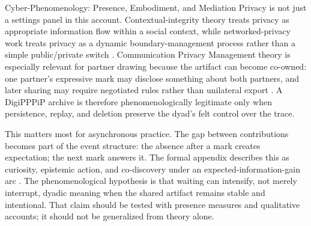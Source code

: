 \documentclass[
  ignorenonframetext,
]{beamer}
\begin{document}
\begin{frame}[allowframebreaks]{Cyber-Phenomenology: Presence,
Embodiment, and Mediation}
Privacy is not just a settings panel in this account.
Contextual-integrity theory treats privacy as appropriate information
flow within a social context, while networked-privacy work treats
privacy as a dynamic boundary-management process rather than a simple
public/private switch . Communication Privacy Management theory is
especially relevant for partner drawing because the artifact can become
co-owned: one partner's expressive mark may disclose something about
both partners, and later sharing may require negotiated rules rather
than unilateral export . A DigiPPPiP archive is
therefore phenomenologically legitimate only when persistence, replay,
and deletion preserve the dyad's felt control over the trace.

This matters most for asynchronous practice. The gap between
contributions becomes part of the event structure: the absence after a
mark creates expectation; the next mark answers it. The formal appendix
describes this as curiosity, epistemic action, and co-discovery under an
expected-information-gain arc . The
phenomenological hypothesis is that waiting can intensify, not merely
interrupt, dyadic meaning when the shared artifact remains stable and
intentional. That claim should be tested with presence measures and
qualitative accounts; it should not be generalized from theory alone.
\end{frame}
\end{document}
